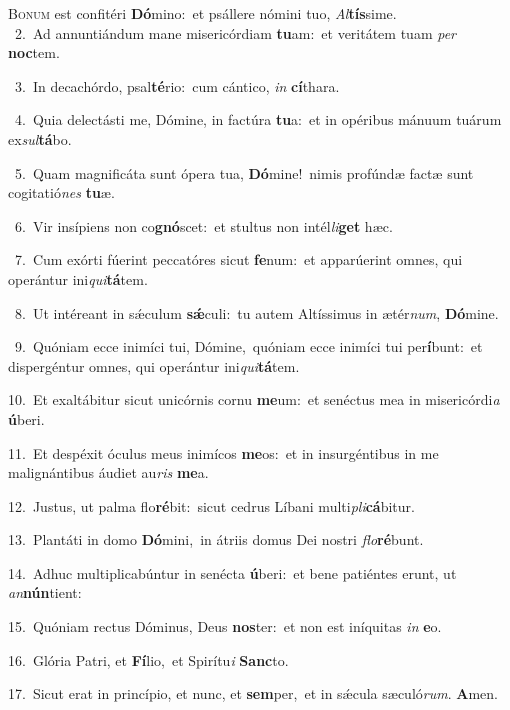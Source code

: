 \lettrine{\initial\textcolor{\initialcolor}{B}}{onum} est confitéri \textbf{Dó}\-mino:~\star et psállere nómini tuo, \textit{Al}\-\textbf{tís}sime.\\
{\numbfont\textcolor{\numbcolor}{~2.}}~Ad annuntiándum mane misericórdiam \textbf{tu}\-am:~\star et veritátem tuam \textit{per} \textbf{noc}\-tem.\par
{\numbfont\textcolor{\numbcolor}{~3.}}~In decachórdo, psal\-\textbf{té}\-rio:~\star cum cántico, \textit{in} \textbf{cí}\-thara.\par
{\numbfont\textcolor{\numbcolor}{~4.}}~Quia delectásti me, Dómine, in factúra \textbf{tu}\-a:~\star et in opéribus mánuum tuárum ex\-\textit{sul}\-\textbf{tá}bo.\par
{\numbfont\textcolor{\numbcolor}{~5.}}~Quam magnificáta sunt ópera tua, \textbf{Dó}\-mine!~\star nimis profúndæ factæ sunt cogitatió\textit{nes} \textbf{tu}\-æ.\par
{\numbfont\textcolor{\numbcolor}{~6.}}~Vir insípiens non co\-\textbf{gnó}\-scet:~\star et stultus non intél\-\textit{li}\-\textbf{get} hæc.\par
{\numbfont\textcolor{\numbcolor}{~7.}}~Cum exórti fúerint peccatóres sicut \textbf{fe}\-num:~\star et apparúerint omnes, qui operántur ini\-\textit{qui}\-\textbf{tá}tem.\par
{\numbfont\textcolor{\numbcolor}{~8.}}~Ut intéreant in sǽculum \textbf{sǽ}\-culi:~\star tu autem Altíssimus in ætér\-\textit{num}\-, \textbf{Dó}\-mine.\par
{\numbfont\textcolor{\numbcolor}{~9.}}~Quóniam ecce inimíci tui, Dómine,~\dagger quóniam ecce inimíci tui per\-\textbf{í}\-bunt:~\star et dispergéntur omnes, qui operántur ini\-\textit{qui}\-\textbf{tá}tem.\par
{\numbfont\textcolor{\numbcolor}{10.}}~Et exaltábitur sicut unicórnis cornu \textbf{me}\-um:~\star et senéctus mea in misericórdi\textit{a} \textbf{ú}\-beri.\par
{\numbfont\textcolor{\numbcolor}{11.}}~Et despéxit óculus meus inimícos \textbf{me}\-os:~\star et in insurgéntibus in me malignántibus áudiet au\textit{ris} \textbf{me}\-a.\par
{\numbfont\textcolor{\numbcolor}{12.}}~Justus, ut palma flo\-\textbf{ré}\-bit:~\star sicut cedrus Líbani multi\-\textit{pli}\-\textbf{cá}bitur.\par
{\numbfont\textcolor{\numbcolor}{13.}}~Plantáti in domo \textbf{Dó}\-mini,~\star in átriis domus Dei nostri \textit{flo}\-\textbf{ré}bunt.\par
{\numbfont\textcolor{\numbcolor}{14.}}~Adhuc multiplicabúntur in senécta \textbf{ú}\-beri:~\star et bene patiéntes erunt, ut \textit{an}\-\textbf{nún}tient:\par
{\numbfont\textcolor{\numbcolor}{15.}}~Quóniam rectus Dóminus, Deus \textbf{nos}\-ter:~\star et non est iníquitas \textit{in} \textbf{e}\-o.\par
{\numbfont\textcolor{\numbcolor}{16.}}~Glória Patri, et \textbf{Fí}\-lio,~\star et Spirítu\textit{i} \textbf{Sanc}\-to.\par
{\numbfont\textcolor{\numbcolor}{17.}}~Sicut erat in princípio, et nunc, et \textbf{sem}\-per,~\star et in sǽcula sæculó\-\textit{rum}\-. \textbf{A}\-men.\par
